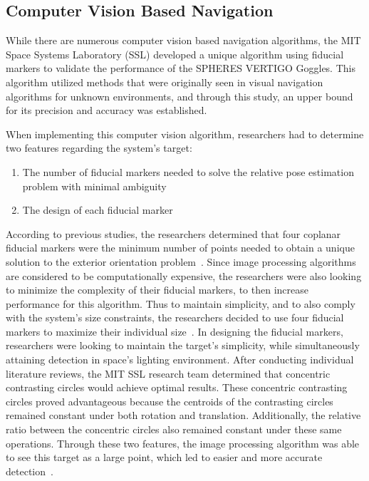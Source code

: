 \documentclass[journal, 10pt]{IEEEtran}
\begin{document}
\subsection{Computer Vision Based Navigation}

While there are numerous computer vision based navigation algorithms, the MIT Space Systems Laboratory (SSL) developed a unique algorithm using fiducial markers to validate the performance of the SPHERES VERTIGO Goggles. This algorithm utilized methods that were originally seen in visual navigation algorithms for unknown environments, and through this study, an upper bound for its precision and accuracy was established.


When implementing this computer vision algorithm, researchers had to determine two features regarding the system's target:
\begin{enumerate}
\item The number of fiducial markers needed to solve the relative pose estimation problem with minimal ambiguity
\item The design of each fiducial marker
\end{enumerate}

According to previous studies, the researchers determined that four coplanar fiducial markers were the minimum number of points needed to obtain a unique solution to the exterior orientation problem~\cite{Thesis}. Since image processing algorithms are considered to be computationally expensive, the researchers were also looking to minimize the complexity of their fiducial markers, to then increase performance for this algorithm. Thus to maintain simplicity, and to also comply with the system's size constraints, the researchers decided to use four fiducial markers to maximize their individual size~\cite{Vision, Thesis}. In designing the fiducial markers, researchers were looking to maintain the target's simplicity, while simultaneously attaining detection in space's lighting environment. After conducting individual literature reviews, the MIT SSL research team determined that concentric contrasting circles would achieve optimal results. These concentric contrasting circles proved advantageous because the centroids of the contrasting circles remained constant under both rotation and translation. Additionally, the relative ratio between the concentric circles also remained constant under these same operations. Through these two features,  the image processing algorithm was able to see this target as a large point, which led to easier and more accurate detection~\cite{Vision, Thesis}.
\end{document}
